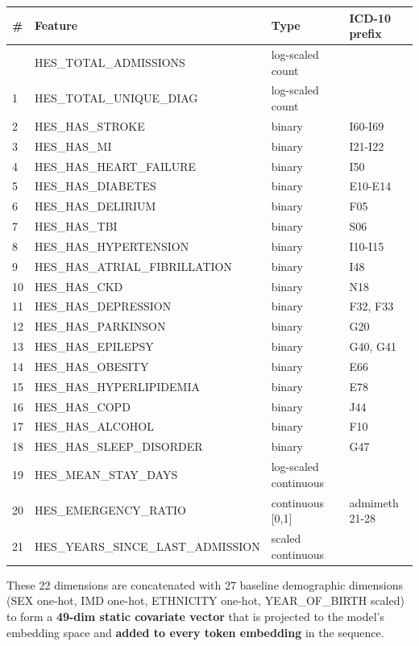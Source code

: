 \documentclass[
  11pt,
]{article}
\newcounter{none} %
\begin{document}
{\def\LTcaptype{none} %
\begin{longtable}[]{|l|l|l|l|}
\hline
\# & Feature & Type & ICD-10 prefix \\
\hline
\hline
\endhead
\hline
\endlastfoot
0 & HES\_TOTAL\_ADMISSIONS & log-scaled count & \\
\hline
1 & HES\_TOTAL\_UNIQUE\_DIAG & log-scaled count & \\
\hline
2 & HES\_HAS\_STROKE & binary & I60-I69 \\
\hline
3 & HES\_HAS\_MI & binary & I21-I22 \\
\hline
4 & HES\_HAS\_HEART\_FAILURE & binary & I50 \\
\hline
5 & HES\_HAS\_DIABETES & binary & E10-E14 \\
\hline
6 & HES\_HAS\_DELIRIUM & binary & F05 \\
\hline
7 & HES\_HAS\_TBI & binary & S06 \\
\hline
8 & HES\_HAS\_HYPERTENSION & binary & I10-I15 \\
\hline
9 & HES\_HAS\_ATRIAL\_FIBRILLATION & binary & I48 \\
\hline
10 & HES\_HAS\_CKD & binary & N18 \\
\hline
11 & HES\_HAS\_DEPRESSION & binary & F32, F33 \\
\hline
12 & HES\_HAS\_PARKINSON & binary & G20 \\
\hline
13 & HES\_HAS\_EPILEPSY & binary & G40, G41 \\
\hline
14 & HES\_HAS\_OBESITY & binary & E66 \\
\hline
15 & HES\_HAS\_HYPERLIPIDEMIA & binary & E78 \\
\hline
16 & HES\_HAS\_COPD & binary & J44 \\
\hline
17 & HES\_HAS\_ALCOHOL & binary & F10 \\
\hline
18 & HES\_HAS\_SLEEP\_DISORDER & binary & G47 \\
\hline
19 & HES\_MEAN\_STAY\_DAYS & log-scaled continuous & \\
\hline
20 & HES\_EMERGENCY\_RATIO & continuous {[}0,1{]} & admimeth 21-28 \\
\hline
21 & HES\_YEARS\_SINCE\_LAST\_ADMISSION & scaled continuous & \\
\hline
\end{longtable}
}

These 22 dimensions are concatenated with 27 baseline demographic
dimensions (SEX one-hot, IMD one-hot, ETHNICITY one-hot, YEAR\_OF\_BIRTH
scaled) to form a \textbf{49-dim static covariate vector} that is
projected to the model's embedding space and \textbf{added to every
token embedding} in the sequence.
\end{document}
